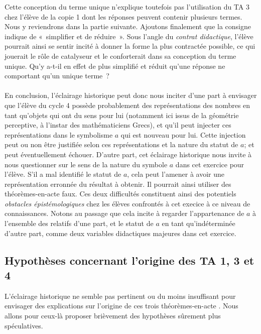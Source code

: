 \documentclass{report}
\theoremstyle{definition}
\newcommand{\tas}{théorèmes-en-acte }
\begin{document}
Cette conception du terme unique n'explique toutefois pas l'utilisation du TA 3 chez l'élève de la copie 1 dont les réponses peuvent contenir plusieurs termes. Nous y reviendrons dans la partie suivante.
Ajoutons finalement que la consigne indique de «~simplifier et de réduire~». Sous l'angle du \textit{contrat didactique}, l'élève pourrait ainsi se sentir incité à donner la forme la plus contractée possible, ce qui jouerait le rôle de catalyseur et le conforterait dans sa conception du terme unique. Qu'y a-t-il en effet de plus simplifié et réduit qu'une réponse ne comportant qu'un unique terme~?

\paragraph*{}

En conclusion, l'éclairage historique peut donc nous inciter d'une part à envisager que l'élève du cycle 4 possède probablement des représentations des nombres en tant qu'objets qui ont du sens pour lui (notamment ici issus de la géométrie perceptive, à l'instar des mathématiciens Grecs), et qu'il peut injecter ces représentations dans le symbolisme $a$ qui est nouveau pour lui. Cette injection peut ou non être justifiée selon ces représentations et la nature du statut de $a$; et peut éventuellement échouer. D'autre part, cet éclairage historique nous invite à nous questionner sur le sens de la nature du symbole $a$ dans cet exercice pour l'élève. S'il a mal identifié le statut de $a$, cela peut l'amener à avoir une représentation erronnée du résultat à obtenir. Il pourrait ainsi utiliser des \tas faux.
Ces deux difficultés constituent ainsi des potentiels \textit{obstacles épistémologiques} chez les élèves confrontés à cet execice à ce niveau de connaissances.
Notons au passage que cela incite à regarder l'appartenance de $a$ à l'ensemble des relatifs d'une part, et le statut de $a$ en tant qu'indéterminée d'autre part, comme deux variables didactiques majeures dans cet exercice.

\subsection*{Hypothèses concernant l'origine des TA 1, 3 et 4}

L'éclairage historique ne semble pas pertinent ou du moins insuffisant pour envisager des explications sur l'origine de ces trois \tas. Nous allons pour ceux-là proposer brièvement des hypothèses sûrement plus spéculatives.
\end{document}
